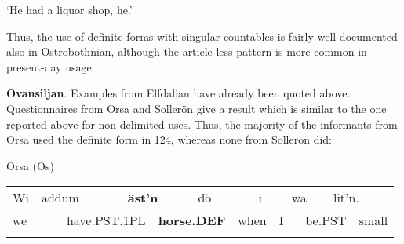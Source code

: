 \begin{styleTranslation}
‘He had a liquor shop, he.’ 

\end{styleTranslation}

\begin{styleBodyTextFirst}
Thus, the use of definite forms with singular countables is fairly well documented also in Ostrobothnian, although the article-less pattern is more common in present-day usage.

\end{styleBodyTextFirst}

\begin{styleBodytextC}
\textbf{Ovansiljan}. Examples from Elfdalian have already been quoted above. Questionnaires from Orsa and Sollerön give a result which is similar to the one reported above for non-delimited uses. Thus, the majority of the informants from Orsa used the definite form in 124, whereas none from Sollerön did:

\end{styleBodytextC}

\begin{listWWNumileveli}
\item 

\begin{styleExample}
\label{bkm:Ref224103820}Orsa (Os)

\end{styleExample}

\end{listWWNumileveli}

\begin{tabular}{llllllllllllll}
\lsptoprule
Wi & \multicolumn{2}{l}{addum

} & \multicolumn{2}{l}{{\bfseries äst’n}

} & \multicolumn{2}{l}{dö

} & \multicolumn{2}{l}{i

} & \multicolumn{2}{l}{wa

} & \multicolumn{2}{l}{lit’n.

} & \\
\multicolumn{2}{l}{we

} & \multicolumn{2}{l}{have.PST.1PL

} & \multicolumn{2}{l}{{\bfseries horse.DEF}

} & \multicolumn{2}{l}{when

} & \multicolumn{2}{l}{I 

} & \multicolumn{2}{l}{be.PST

} & \multicolumn{2}{l}{small

}\\
\lspbottomrule
\end{tabular}

